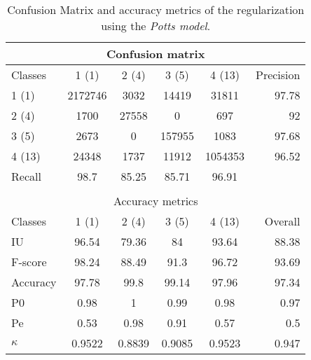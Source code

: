 \begin{table}[H]
\begin{center}
\footnotesize
\begin{tabular}{|l|c|c|c|c|r|}
\hline
\multicolumn{6}{|c|}{Confusion matrix} \\
\hline
 Classes & 1 (1) & 2 (4) & 3 (5) & 4 (13) & Precision \\
\hline
1 (1) & 2172746 & 3032 & 14419 & 31811 & 97.78 \\
\hline
2 (4) & 1700 & 27558 & 0 & 697 & 92 \\
\hline
3 (5) & 2673 & 0 & 157955 & 1083 & 97.68 \\
\hline
4 (13) & 24348 & 1737 & 11912 & 1054353 & 96.52 \\
\hline
Recall & 98.7 & 85.25 & 85.71 & 96.91 &  \\
\hline
\multicolumn{6}{c}{ } \\
\hline
\multicolumn{6}{|c|}{Accuracy metrics} \\
\hline
 Classes & 1 (1) & 2 (4) & 3 (5) & 4 (13) & Overall \\
\hline
IU & 96.54 & 79.36 & 84 & 93.64 & 88.38 \\
\hline
F-score & 98.24 & 88.49 & 91.3 & 96.72 & 93.69 \\
\hline
Accuracy & 97.78 & 99.8 & 99.14 & 97.96 & 97.34 \\
\hline
P0 & 0.98 & 1 & 0.99 & 0.98 & 0.97 \\
\hline
Pe & 0.53 & 0.98 & 0.91 & 0.57 & 0.5 \\
\hline
$\kappa$ & 0.9522 & 0.8839 & 0.9085 & 0.9523 & 0.947 \\
\hline
\end{tabular}
\caption{Confusion Matrix and accuracy metrics of the regularization  using the \textit{Potts model}.}
\label{table:}
\end{center}
\end{table}

